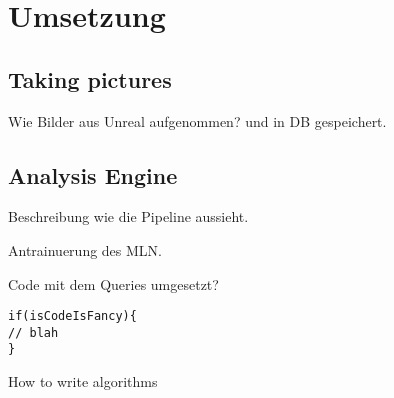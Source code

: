 \graphicspath{{./images/}}      
\def\CHAPTERONE{./chapters/Chapter-1} 

\chapter{Umsetzung}
\label{chap:implementation}
%	


\section{Taking pictures}
\label{chap:takingpics}
Wie Bilder aus Unreal aufgenommen? und in DB gespeichert.

\section{Analysis Engine}
\label{chap:analysisengine}
Beschreibung wie die Pipeline aussieht.


Antrainuerung des MLN.

Code mit dem Queries umgesetzt?


\begin{algorithm}[H]
\begin{lstlisting}
if(isCodeIsFancy){
// blah
}
\end{lstlisting}
 \caption{How to write algorithms}
\end{algorithm}
